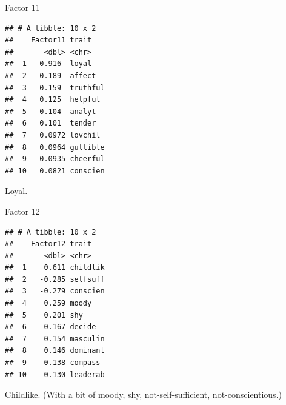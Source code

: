 \documentclass[
  ignorenonframetext,
]{beamer}
\newenvironment{Shaded}{\begin{snugshade}}{\end{snugshade}}
\newcommand{\DecValTok}[1]{\textcolor[rgb]{0.00,0.00,0.81}{#1}}
\newcommand{\KeywordTok}[1]{\textcolor[rgb]{0.13,0.29,0.53}{\textbf{#1}}}
\newcommand{\NormalTok}[1]{#1}
\newcommand{\OperatorTok}[1]{\textcolor[rgb]{0.81,0.36,0.00}{\textbf{#1}}}
\newcommand{\StringTok}[1]{\textcolor[rgb]{0.31,0.60,0.02}{#1}}
\begin{document}
\begin{frame}[fragile]{Factor 11}
\protect\hypertarget{factor-11}{}

\footnotesize

\begin{Shaded}
\end{Shaded}

\begin{verbatim}
## # A tibble: 10 x 2
##    Factor11 trait   
##       <dbl> <chr>   
##  1   0.916  loyal   
##  2   0.189  affect  
##  3   0.159  truthful
##  4   0.125  helpful 
##  5   0.104  analyt  
##  6   0.101  tender  
##  7   0.0972 lovchil 
##  8   0.0964 gullible
##  9   0.0935 cheerful
## 10   0.0821 conscien
\end{verbatim}

\normalsize

Loyal.

\end{frame}

\begin{frame}[fragile]{Factor 12}
\protect\hypertarget{factor-12}{}

\footnotesize

\begin{Shaded}
\end{Shaded}

\begin{verbatim}
## # A tibble: 10 x 2
##    Factor12 trait   
##       <dbl> <chr>   
##  1    0.611 childlik
##  2   -0.285 selfsuff
##  3   -0.279 conscien
##  4    0.259 moody   
##  5    0.201 shy     
##  6   -0.167 decide  
##  7    0.154 masculin
##  8    0.146 dominant
##  9    0.138 compass 
## 10   -0.130 leaderab
\end{verbatim}

\normalsize

Childlike. (With a bit of moody, shy, not-self-sufficient,
not-conscientious.)

\end{frame}
\end{document}
